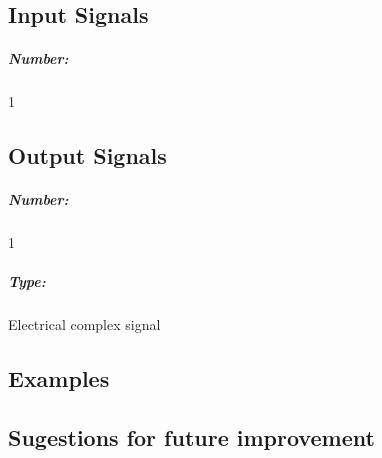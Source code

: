 \pagebreak
\subsection*{Input Signals}

\subparagraph*{Number:} 1

\subsection*{Output Signals}

\subparagraph*{Number:} 1

\subparagraph*{Type:} Electrical complex signal

\subsection*{Examples}

\subsection*{Sugestions for future improvement}


